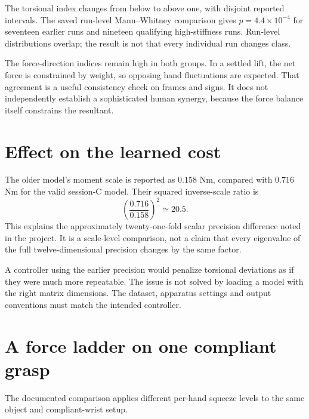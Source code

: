 
The torsional index changes from below to above one, with disjoint reported intervals. The saved run-level Mann--Whitney comparison gives $p=4.4\times10^{-4}$ for seventeen earlier runs and nineteen qualifying high-stiffness runs. Run-level distributions overlap; the result is not that every individual run changes class.

The force-direction indices remain high in both groups. In a settled lift, the net force is constrained by weight, so opposing hand fluctuations are expected. That agreement is a useful consistency check on frames and signs. It does not independently establish a sophisticated human synergy, because the force balance itself constrains the resultant.

\section{Effect on the learned cost}

The older model's moment scale is reported as $0.158$ Nm, compared with $0.716$ Nm for the valid session-C model. Their squared inverse-scale ratio is
\begin{equation}
\left(\frac{0.716}{0.158}\right)^2\simeq20.5.
\end{equation}
This explains the approximately twenty-one-fold scalar precision difference noted in the project. It is a scale-level comparison, not a claim that every eigenvalue of the full twelve-dimensional precision changes by the same factor.

A controller using the earlier precision would penalize torsional deviations as if they were much more repeatable. The issue is not solved by loading a model with the right matrix dimensions. The dataset, apparatus settings and output conventions must match the intended controller.

\section{A force ladder on one compliant grasp}

The documented comparison applies different per-hand squeeze levels to the same object and compliant-wrist setup.


